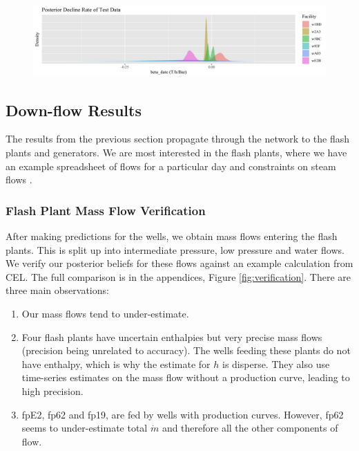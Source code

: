 \documentclass[a4paper, 12pt]{article}
\begin{document}
\begin{figure}
  \centering
  \includegraphics[width=\linewidth]{media/beta_date}
  \label{fig:beta_date}
\end{figure}

\subsection{Down-flow Results}
The results from the previous section propagate through the network to the flash plants and generators. We are most interested in the flash plants, where we have an example spreadsheet of flows for a particular day and constraints on steam flows .

\subsubsection{Flash Plant Mass Flow Verification}

After making predictions for the wells, we obtain mass flows entering the flash plants. This is split up into intermediate pressure, low pressure and water flows. We verify our posterior beliefs for these flows against an example calculation from CEL. The full comparison is in the appendices, Figure \ref{fig:verification}. There are three main observations:

\begin{enumerate}
\item Our mass flows tend to under-estimate.
\item Four flash plants have uncertain enthalpies but very precise mass flows (precision being unrelated to accuracy). The wells feeding these plants do not have enthalpy, which is why the estimate for $h$ is disperse. They also use time-series estimates on the mass flow without a production curve, leading to high precision.
\item fpE2, fp62 and fp19, are fed by wells with production curves. However, fp62 seems to under-estimate total $\dot{m}$ and therefore all the other components of flow.
\end{enumerate}
\end{document}
